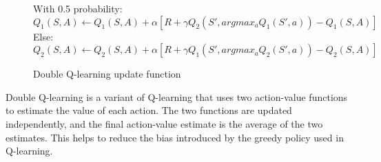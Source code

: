 \begin{figure}[h]
    With 0.5 probability:
    $$Q_1(S,A) \leftarrow Q_1(S,A) + \alpha [R + \gamma  Q_2(S', argmax_a Q_1(S',a)) - Q_1(S,A)]$$
    	Else:
    	$$Q_2(S,A) \leftarrow Q_2(S,A) + \alpha [R + \gamma Q_1(S', argmax_a Q_2(S',a)) - Q_2(S,A)]$$
    \caption{Double Q-learning update function}
    \label{algo:DQL}
\end{figure}
Double Q-learning is a variant of Q-learning that uses two action-value functions to estimate the value of each action. The two functions are updated independently, and the final action-value estimate is the average of the two estimates. This helps to reduce the bias introduced by the greedy policy used in Q-learning.